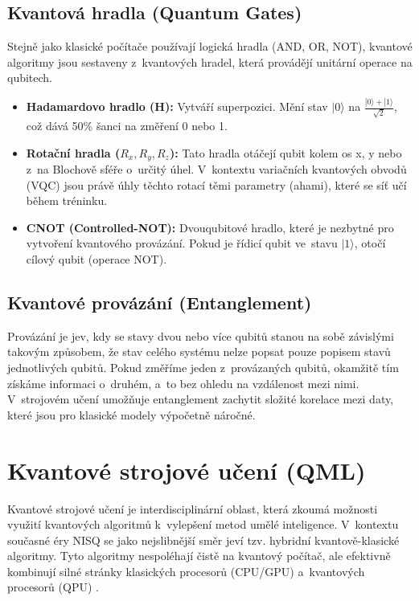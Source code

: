 \documentclass[12pt, a4paper]{report}
\begin{document}
\subsection{Kvantová hradla (Quantum Gates)}
Stejně jako klasické počítače používají logická hradla (AND, OR, NOT), kvantové algoritmy jsou sestaveny z~kvantových hradel, která provádějí unitární operace na qubitech.
\begin{itemize}
    \item \textbf{Hadamardovo hradlo (H):} Vytváří superpozici.
    Mění stav $|0\rangle$ na $\frac{|0\rangle + |1\rangle}{\sqrt{2}}$, což dává 50\% šanci na změření 0 nebo 1.
    \item \textbf{Rotační hradla ($R_x, R_y, R_z$):} Tato hradla otáčejí qubit kolem os x, y nebo z~na Blochově sféře o~určitý úhel.
    V~kontextu variačních kvantových obvodů (VQC) jsou právě úhly těchto rotací těmi parametry (ahami), které se síť učí během tréninku.
    \item \textbf{CNOT (Controlled-NOT):} Dvouqubitové hradlo, které je nezbytné pro vytvoření kvantového provázání.
    Pokud je řídicí qubit ve~stavu $|1\rangle$, otočí cílový qubit (operace NOT).
\end{itemize}

\subsection{Kvantové provázání (Entanglement)}
Provázání je jev, kdy se stavy dvou nebo více qubitů stanou na sobě závislými takovým způsobem, že stav celého systému nelze popsat pouze popisem stavů jednotlivých qubitů.
Pokud změříme jeden z~provázaných qubitů, okamžitě tím získáme informaci o~druhém, a~to bez ohledu na vzdálenost mezi nimi.
V~strojovém učení umožňuje entanglement zachytit složité korelace mezi daty, které jsou pro klasické modely výpočetně náročné.

\section{Kvantové strojové učení (QML)} \label{sec:qml}

Kvantové strojové učení je interdisciplinární oblast, která zkoumá možnosti využití kvantových algoritmů k~vylepšení metod umělé inteligence.
V~kontextu současné éry NISQ se jako nejslibnější směr jeví tzv. hybridní kvantově-klasické algoritmy.
Tyto algoritmy nespoléhají čistě na kvantový počítač, ale efektivně kombinují silné stránky klasických procesorů (CPU/GPU) a~kvantových procesorů (QPU) \cite{schuld_book}.
\end{document}
